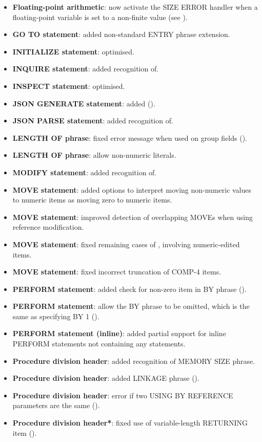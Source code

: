 \begin{itemize}
\item \textbf{Floating-point arithmetic}: now activate the SIZE ERROR handler when a floating-point variable is set to a non-finite value (see ).
\item \textbf{GO TO statement}: added non-standard ENTRY phrase extension.
\item \textbf{INITIALIZE statement}: optimised.
\item \textbf{INQUIRE statement}: added recognition of.
\item \textbf{INSPECT statement}: optimised.
\item \textbf{JSON GENERATE statement}: added ().
\item \textbf{JSON PARSE statement}: added recognition of.
\item \textbf{LENGTH OF phrase}: fixed error message when used on group fields ().
\item \textbf{LENGTH OF phrase}: allow non-numeric literals.
\item \textbf{MODIFY statement}: added recognition of.
\item \textbf{MOVE statement}: added options to interpret moving non-numeric values to numeric items as moving zero to numeric items.
\item \textbf{MOVE statement}: improved detection of overlapping MOVEs when using reference modification.
\item \textbf{MOVE statement}: fixed remaining cases of , involving numeric-edited items.
\item \textbf{MOVE statement}: fixed incorrect truncation of COMP-4 items.
\item \textbf{PERFORM statement}: added check for non-zero item in BY phrase ().
\item \textbf{PERFORM statement}: allow the BY phrase to be omitted, which is the same as specifying BY 1 ().
\item \textbf{PERFORM statement (inline)}: added partial support for inline PERFORM statements not containing any statements.
\item \textbf{Procedure division header}: added recognition of MEMORY SIZE phrase.
\item \textbf{Procedure division header}: added LINKAGE phrase ().
\item \textbf{Procedure division header}: error if two USING BY REFERENCE parameters are the same ().
\item \textbf{Procedure division header*}: fixed use of variable-length RETURNING item ().

\end{itemize}
